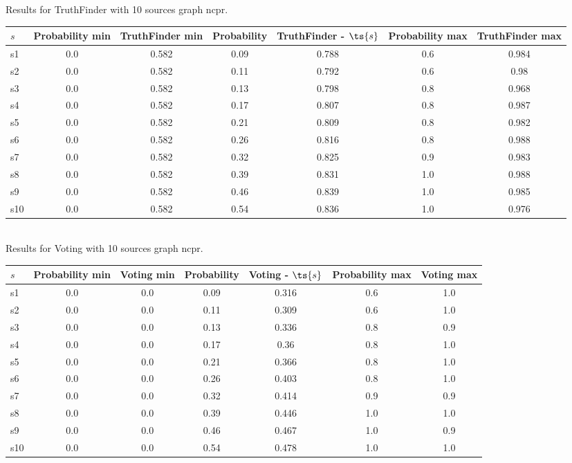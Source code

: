 \documentclass{article}
\begin{document}
\noindent Results for TruthFinder with 10 sources graph ncpr.

\noindent\begin{tabular}{|l|c|c|c|c|c|c|}
\hline
$s$& Probability min & TruthFinder min & Probability & TruthFinder - $\ts{s}$ & Probability max & TruthFinder max\\
\hline
s1 &0.0 & 0.582 & 0.09 & 0.788 & 0.6 & 0.984\\
\hline
s2 &0.0 & 0.582 & 0.11 & 0.792 & 0.6 & 0.98\\
\hline
s3 &0.0 & 0.582 & 0.13 & 0.798 & 0.8 & 0.968\\
\hline
s4 &0.0 & 0.582 & 0.17 & 0.807 & 0.8 & 0.987\\
\hline
s5 &0.0 & 0.582 & 0.21 & 0.809 & 0.8 & 0.982\\
\hline
s6 &0.0 & 0.582 & 0.26 & 0.816 & 0.8 & 0.988\\
\hline
s7 &0.0 & 0.582 & 0.32 & 0.825 & 0.9 & 0.983\\
\hline
s8 &0.0 & 0.582 & 0.39 & 0.831 & 1.0 & 0.988\\
\hline
s9 &0.0 & 0.582 & 0.46 & 0.839 & 1.0 & 0.985\\
\hline
s10 &0.0 & 0.582 & 0.54 & 0.836 & 1.0 & 0.976\\
\hline
\end{tabular}\\

\noindent Results for Voting with 10 sources graph ncpr.

\noindent\begin{tabular}{|l|c|c|c|c|c|c|}
\hline
$s$& Probability min & Voting min & Probability & Voting - $\ts{s}$ & Probability max & Voting max\\
\hline
s1 &0.0 & 0.0 & 0.09 & 0.316 & 0.6 & 1.0\\
\hline
s2 &0.0 & 0.0 & 0.11 & 0.309 & 0.6 & 1.0\\
\hline
s3 &0.0 & 0.0 & 0.13 & 0.336 & 0.8 & 0.9\\
\hline
s4 &0.0 & 0.0 & 0.17 & 0.36 & 0.8 & 1.0\\
\hline
s5 &0.0 & 0.0 & 0.21 & 0.366 & 0.8 & 1.0\\
\hline
s6 &0.0 & 0.0 & 0.26 & 0.403 & 0.8 & 1.0\\
\hline
s7 &0.0 & 0.0 & 0.32 & 0.414 & 0.9 & 0.9\\
\hline
s8 &0.0 & 0.0 & 0.39 & 0.446 & 1.0 & 1.0\\
\hline
s9 &0.0 & 0.0 & 0.46 & 0.467 & 1.0 & 0.9\\
\hline
s10 &0.0 & 0.0 & 0.54 & 0.478 & 1.0 & 1.0\\
\hline
\end{tabular}\\
\end{document}
